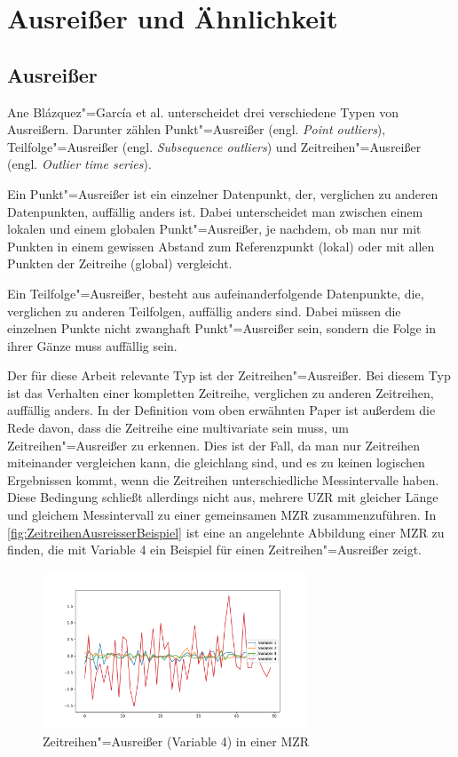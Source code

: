 \section{Ausreißer und Ähnlichkeit}
\subsection{Ausreißer}
Ane Blázquez"=García et al. \cite[Ch. 2.2]{reviewOutlierDetection} unterscheidet drei verschiedene Typen von Ausreißern. Darunter zählen Punkt"=Ausreißer (engl. \textit{Point outliers}), Teilfolge"=Ausreißer (engl. \textit{Subsequence outliers}) und Zeitreihen"=Ausreißer (engl. \textit{Outlier time series}).

Ein Punkt"=Ausreißer ist ein einzelner Datenpunkt, der, verglichen zu anderen Datenpunkten, auffällig anders ist. Dabei unterscheidet man zwischen einem lokalen und einem globalen Punkt"=Ausreißer, je nachdem, ob man nur mit Punkten in einem gewissen Abstand zum Referenzpunkt (lokal) oder mit allen Punkten der Zeitreihe (global) vergleicht.

Ein Teilfolge"=Ausreißer, besteht aus aufeinanderfolgende Datenpunkte, die, verglichen zu anderen Teilfolgen, auffällig anders sind. Dabei müssen die einzelnen Punkte nicht zwanghaft Punkt"=Ausreißer sein, sondern die Folge in ihrer Gänze muss auffällig sein. 

Der für diese Arbeit relevante Typ ist der Zeitreihen"=Ausreißer. Bei diesem Typ ist das Verhalten einer kompletten Zeitreihe, verglichen zu anderen Zeitreihen, auffällig anders. In der Definition vom oben erwähnten Paper \cite{reviewOutlierDetection} ist außerdem die Rede davon, dass die Zeitreihe eine multivariate sein muss, um Zeitreihen"=Ausreißer zu erkennen. Dies ist der Fall, da man nur Zeitreihen miteinander vergleichen kann, die gleichlang sind, und es zu keinen logischen Ergebnissen kommt, wenn die Zeitreihen unterschiedliche Messintervalle haben. Diese Bedingung schließt allerdings nicht aus, mehrere \acs{UZR} mit gleicher Länge und gleichem Messintervall zu einer gemeinsamen \acs{MZR} zusammenzuführen. In \autoref{fig:ZeitreihenAusreisserBeispiel} ist eine an \cite[Fig. 5]{reviewOutlierDetection} angelehnte Abbildung einer \acs{MZR} zu finden, die mit Variable 4 ein Beispiel für einen Zeitreihen"=Ausreißer zeigt.
\begin{figure}[bth] 
  \centering
  \includegraphics[width=0.7\textwidth]{Graphics/TimeSeriesOutlierExample.pdf}
  \caption{Zeitreihen"=Ausreißer (Variable 4) in einer \acs{MZR}}
  \label{fig:ZeitreihenAusreisserBeispiel}
\end{figure}

